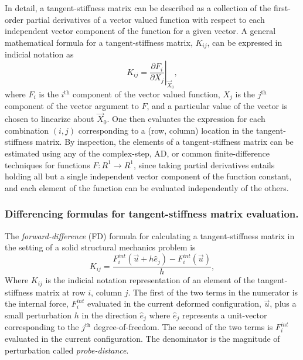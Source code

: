 \documentclass[preprint,12pt]{elsarticle}
\begin{document}
In detail, a tangent-stiffness matrix can be described as a collection of the first-order partial derivatives of a vector valued function with respect to each independent vector component of the function for a given vector.   A general mathematical formula for a tangent-stiffness matrix, $K_{ij}$,
can be expressed in indicial notation as 
%
\begin{equation} 
  K_{ij} = \left. \frac{\partial F_i}{\partial X_j}\right|_{\vec{X}_0},
\end{equation}
%
where $F_i$ is the $i^{\mbox{th}}$ component of the vector valued function, $X_j$ is the $j^{\mbox{th}}$ component of the vector argument to $F$, and a particular value of the vector is chosen to linearize about $\vec{X}_0$. One then evaluates the expression for each combination $(i, j)$ corresponding to a (row, column) location in the tangent-stiffness matrix. By inspection, the elements of a tangent-stiffness matrix can be estimated using any of the complex-step, AD, or common finite-difference techniques for functions $F:R^1 \rightarrow R^1$, since taking partial derivatives entails holding all but a single independent vector component of the function constant, and each element of the function can be evaluated independently of the others. \\ 

\subsubsection{Differencing formulas for tangent-stiffness matrix evaluation.}

The \emph{forward-difference} (FD) formula for calculating a tangent-stiffness matrix in the setting of a solid structural mechanics problem is
%
\begin{equation} 
  K_{ij} = \frac{F_i^{int}(\vec{u} + h \hat{e}_j) - F_i^{int}(\vec{u})}{h},
\end{equation}
%
Where $K_{ij}$ is the indicial notation representation of an element of the tangent-stiffness matrix at row $i$, column $j$. The first of the two terms in the numerator is the internal force, $F_i^{int}$ evaluated in the current deformed configuration, $\vec{u}$,  plus a small perturbation $h$ in the direction $\hat{e}_j$ where $\hat{e}_j$ represents a unit-vector corresponding to the $j^{\mbox{th}}$ degree-of-freedom. The second of the two terms is $F_i^{int}$ evaluated in the current configuration. The denominator is the magnitude of perturbation called \emph{probe-distance}.
\end{document}
